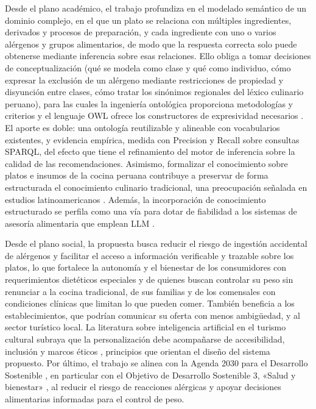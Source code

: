 \documentclass[conference]{IEEEtran}
\begin{document}
Desde el plano académico, el trabajo profundiza en el modelado semántico de un dominio complejo, en el que un plato se relaciona con múltiples ingredientes, derivados y procesos de preparación, y cada ingrediente con uno o varios alérgenos y grupos alimentarios, de modo que la respuesta correcta solo puede obtenerse mediante inferencia sobre esas relaciones. Ello obliga a tomar decisiones de conceptualización (qué se modela como clase y qué como individuo, cómo expresar la exclusión de un alérgeno mediante restricciones de propiedad y disyunción entre clases, cómo tratar los sinónimos regionales del léxico culinario peruano), para las cuales la ingeniería ontológica proporciona metodologías y criterios \cite{gomezperez2004} y el lenguaje OWL ofrece los constructores de expresividad necesarios \cite{allemang2008}. El aporte es doble: una ontología reutilizable y alineable con vocabularios existentes, y evidencia empírica, medida con Precision y Recall sobre consultas SPARQL, del efecto que tiene el refinamiento del motor de inferencia sobre la calidad de las recomendaciones. Asimismo, formalizar el conocimiento sobre platos e insumos de la cocina peruana contribuye a preservar de forma estructurada el conocimiento culinario tradicional, una preocupación señalada en estudios latinoamericanos \cite{garcia2025}. Además, la incorporación de conocimiento estructurado se perfila como una vía para dotar de fiabilidad a los sistemas de asesoría alimentaria que emplean LLM \cite{bagozi2026}.

Desde el plano social, la propuesta busca reducir el riesgo de ingestión accidental de alérgenos y facilitar el acceso a información verificable y trazable sobre los platos, lo que fortalece la autonomía y el bienestar de los consumidores con requerimientos dietéticos especiales y de quienes buscan controlar su peso sin renunciar a la cocina tradicional, de sus familias y de los comensales con condiciones clínicas que limitan lo que pueden comer. También beneficia a los establecimientos, que podrían comunicar su oferta con menos ambigüedad, y al sector turístico local. La literatura sobre inteligencia artificial en el turismo cultural subraya que la personalización debe acompañarse de accesibilidad, inclusión y marcos éticos \cite{sanchez2025}, principios que orientan el diseño del sistema propuesto. Por último, el trabajo se alinea con la Agenda 2030 para el Desarrollo Sostenible \cite{un2015agenda}, en particular con el Objetivo de Desarrollo Sostenible 3, «Salud y bienestar» \cite{un2024sdg3}, al reducir el riesgo de reacciones alérgicas y apoyar decisiones alimentarias informadas para el control de peso.
\end{document}
